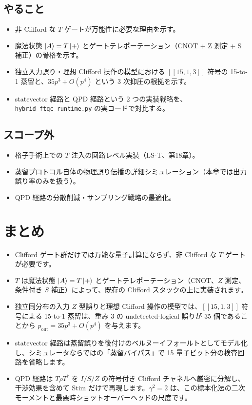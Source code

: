 \subsection{やること}

\begin{itemize}
  \item 非 Clifford な $T$ ゲートが万能性に必要な理由を示す。
  \item 魔法状態 $\ket{A}=T\ket{+}$ とゲートテレポーテーション（CNOT + Z 測定 + S 補正）の骨格を示す。
  \item 独立入力誤り・理想 Clifford 操作の模型における $[[15,1,3]]$ 符号の 15-to-1 蒸留と、$35p^3+O(p^4)$ という 3 次抑圧の根拠を示す。
  \item statevector 経路と QPD 経路という 2 つの実装戦略を、\texttt{hybrid\_ftqc\_runtime.py} の実コードで対比する。
\end{itemize}

\subsection{スコープ外}

\begin{itemize}
  \item 格子手術上での $T$ 注入の回路レベル実装（LS-T、第18章）。
  \item 蒸留プロトコル自体の物理誤り伝播の詳細シミュレーション（本章では出力誤り率のみを扱う）。
  \item QPD 経路の分散削減・サンプリング戦略の最適化。
\end{itemize}

\section{まとめ}\label{ch12:summary}

\begin{itemize}
  \item Clifford ゲート群だけでは万能な量子計算にならず、非 Clifford な $T$ ゲートが必要です。
  \item $T$ は魔法状態 $\ket{A}=T\ket{+}$ とゲートテレポーテーション（$\mathrm{CNOT}$、$Z$ 測定、条件付き $S$ 補正）によって、既存の Clifford スタックの上に実装されます。
  \item 独立同分布の入力 $Z$ 型誤りと理想 Clifford 操作の模型では、$[[15,1,3]]$ 符号による 15-to-1 蒸留は、重み 3 の undetected-logical 誤りが 35 個であることから $p_{\mathrm{out}}=35p^3+O(p^4)$ を与えます。
  \item statevector 経路は蒸留誤りを後付けのベルヌーイフォールトとしてモデル化し、シミュレータならではの「蒸留バイパス」で 15 量子ビット分の検査回路を省略します。
  \item QPD 経路は $T\rho T^\dagger$ を $I/S/Z$ の符号付き Clifford チャネルへ厳密に分解し、干渉効果を含めて Stim だけで再現します。$\gamma^2=2$ は、この標本化法の二次モーメントと最悪時ショットオーバーヘッドの尺度です。
\end{itemize}

